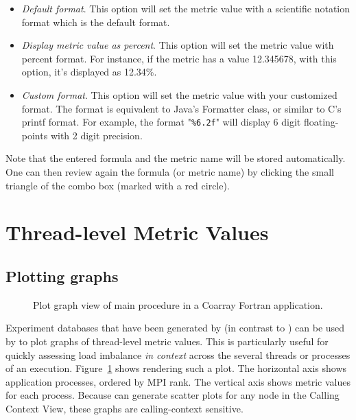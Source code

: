 \begin{itemize}
\begin{itemize}
\item \textit{Default format}. This option will set the metric value with a scientific notation format which is the default format.

\item \textit{Display metric value as percent}. This option will set the metric value with percent format. For instance, if the metric has a value 12.345678, with this option, it's displayed as 12.34\%.

\item \textit{Custom format}. This option will set the metric value with your customized format. The format is equivalent to Java's Formatter class, or similar to C's printf format. For example, the format "\texttt{\%6.2f}" will display 6 digit floating-points with 2 digit precision.

\end{itemize}

\end{itemize}

Note that the entered formula and the metric name will be stored automatically.
One can then review again the formula (or metric name) by clicking the small triangle of the combo box (marked with a red circle).



\section{Thread-level Metric Values}
\label{sec:hpcviewer:thread-level}

\subsection{Plotting graphs}
\label{sec:hpcviewer:plots}
\begin{figure}[t]
\caption{Plot graph view of main procedure in a Coarray Fortran application.}
\label{fig:hpcviewer-view-scatterplot}
\end{figure}


\HPCToolkit{} Experiment databases that have been generated by \hpcprofmpi{} (in contrast to \hpcprof{}) can be used by \hpcviewer{} to plot graphs of thread-level metric values.
This is particularly useful for quickly assessing load imbalance \emph{in context} across the several threads or processes of an execution.
Figure~\ref{fig:hpcviewer-view-scatterplot} shows \hpcviewer{} rendering such a plot.
The horizontal axis shows application processes, ordered by MPI rank.
The vertical axis shows metric values for each process.
Because \hpcviewer{} can generate scatter plots for any node in the Calling Context View, these graphs are calling-context sensitive.

